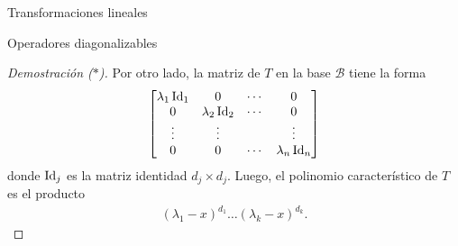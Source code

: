 \begin{chapter}{Transformaciones lineales}
\begin{section}{Operadores diagonalizables}
\begin{proof}[Demostración ($*$)]
            Por otro lado, la matriz de $T$ en la base $\mathcal{B}$ tiene la forma
            \begin{equation*}
                \begin{bmatrix}
                \lambda_1 \operatorname{Id}_1 &0&\cdots&0 \\0&\lambda_2 \operatorname{Id}_2&\cdots&0 \\\vdots&\vdots&&\vdots \\0&0&\cdots&\lambda_n \operatorname{Id}_n 
                \end{bmatrix}
            \end{equation*}
            donde $\operatorname{Id}_j$ es la matriz identidad $d_j \times d_j$. Luego,  el polinomio característico de $T$ es el producto
            \begin{align*}
                (\lambda_1 -x)^{d_1}\ldots(\lambda_k- x)^{d_k}.
            \end{align*}
        \end{proof}
    

\end{section}
\end{chapter}
